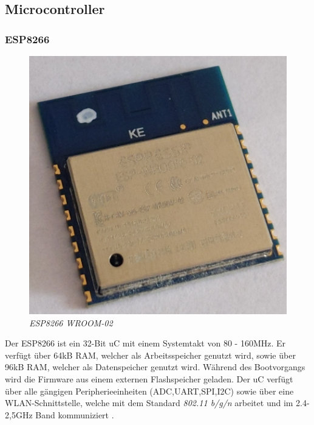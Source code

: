 \subsection{Microcontroller}

\subsubsection{ESP8266}

\begin{figure}
    \vspace{-\baselineskip}
	\centering
	\includegraphics[scale=0.6]{Pictures/esp.jpg}
	\caption{\textit{ESP8266 WROOM-02}}
	\label{img:ESP8266 WROOM-02}
\end{figure}

Der ESP8266 ist ein 32-Bit \ac{uC} mit einem Systemtakt von 80 - 160MHz. Er verfügt über 64kB \acs{RAM}\label{acro:RAM}, welcher als Arbeitsspeicher genutzt
wird, sowie über 96kB \acs{RAM}, welcher als Datenspeicher genutzt wird. Während des Bootvorgangs wird die Firmware aus einem externen Flashspeicher
geladen. Der \ac{uC} verfügt über alle gängigen Peripherieeinheiten (\acs{ADC},\acs{UART},\acs{SPI},\acs{I2C}\label{acro:SPI}) sowie über eine \acs{WLAN}-Schnittstelle,
welche mit dem Standard \textit{802.11 b/g/n} arbeitet und im 2.4-2,5GHz Band kommuniziert \citep{ESP8266_Datasheet}.

